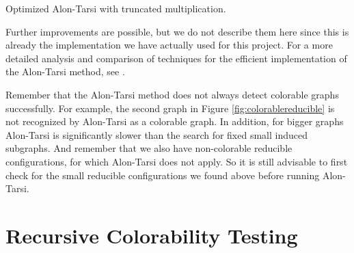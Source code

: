\begin{algorithm}
\caption{Optimized Alon-Tarsi with truncated multiplication.}
\SetAlgoLined
{}


\end{algorithm}

Further improvements are possible, but we do not describe them here since this is already the implementation we have actually used for this project. 
For a more detailed analysis and comparison of techniques for the efficient implementation 
of the Alon-Tarsi method, see \cite{dvorakefficientalontarsi}.


Remember that the Alon-Tarsi method does not always detect colorable graphs successfully. 
For example, the second graph in Figure \ref{fig:colorablereducible} is not recognized by Alon-Tarsi as a colorable graph. 
In addition, for bigger graphs Alon-Tarsi is significantly slower than the search for fixed small induced subgraphs.
And remember that we also have non-colorable reducible configurations, for
which Alon-Tarsi does not apply. 
So it is still advisable to first check for the small 
reducible configurations we found above before running Alon-Tarsi. 

\section{Recursive Colorability Testing}

